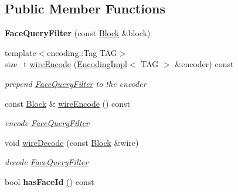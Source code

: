 \subsection*{Public Member Functions}
\begin{DoxyCompactItemize}
\item 
{\bfseries Face\+Query\+Filter} (const \hyperlink{classndn_1_1Block}{Block} \&block)\hypertarget{classndn_1_1nfd_1_1FaceQueryFilter_a1a148182f59de6e34101860c32f19cb5}{}\label{classndn_1_1nfd_1_1FaceQueryFilter_a1a148182f59de6e34101860c32f19cb5}

\item 
{\footnotesize template$<$encoding\+::\+Tag T\+AG$>$ }\\size\+\_\+t \hyperlink{classndn_1_1nfd_1_1FaceQueryFilter_ab3172de2a7ed015f8e51442afac1e1b1}{wire\+Encode} (\hyperlink{classndn_1_1encoding_1_1EncodingImpl}{Encoding\+Impl}$<$ T\+AG $>$ \&encoder) const\hypertarget{classndn_1_1nfd_1_1FaceQueryFilter_ab3172de2a7ed015f8e51442afac1e1b1}{}\label{classndn_1_1nfd_1_1FaceQueryFilter_ab3172de2a7ed015f8e51442afac1e1b1}

\begin{DoxyCompactList}\small\item\em prepend \hyperlink{classndn_1_1nfd_1_1FaceQueryFilter}{Face\+Query\+Filter} to the encoder \end{DoxyCompactList}\item 
const \hyperlink{classndn_1_1Block}{Block} \& \hyperlink{classndn_1_1nfd_1_1FaceQueryFilter_a0c36b0090abbc7497625866db641edc3}{wire\+Encode} () const\hypertarget{classndn_1_1nfd_1_1FaceQueryFilter_a0c36b0090abbc7497625866db641edc3}{}\label{classndn_1_1nfd_1_1FaceQueryFilter_a0c36b0090abbc7497625866db641edc3}

\begin{DoxyCompactList}\small\item\em encode \hyperlink{classndn_1_1nfd_1_1FaceQueryFilter}{Face\+Query\+Filter} \end{DoxyCompactList}\item 
void \hyperlink{classndn_1_1nfd_1_1FaceQueryFilter_abecf0d68ed274b94af4771ae5869c64d}{wire\+Decode} (const \hyperlink{classndn_1_1Block}{Block} \&wire)\hypertarget{classndn_1_1nfd_1_1FaceQueryFilter_abecf0d68ed274b94af4771ae5869c64d}{}\label{classndn_1_1nfd_1_1FaceQueryFilter_abecf0d68ed274b94af4771ae5869c64d}

\begin{DoxyCompactList}\small\item\em decode \hyperlink{classndn_1_1nfd_1_1FaceQueryFilter}{Face\+Query\+Filter} \end{DoxyCompactList}\item 
bool {\bfseries has\+Face\+Id} () const\hypertarget{classndn_1_1nfd_1_1FaceQueryFilter_acca2b80f7f23af9a6b3476148306fd0c}{}\label{classndn_1_1nfd_1_1FaceQueryFilter_acca2b80f7f23af9a6b3476148306fd0c}


\end{DoxyCompactItemize}
